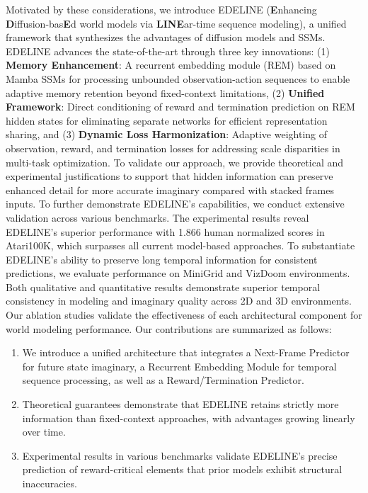 Motivated by these considerations, we introduce EDELINE (\textbf{E}nhancing \textbf{D}iffusion-bas\textbf{E}d world models via \textbf{LINE}ar-time sequence modeling), a unified framework that synthesizes the advantages of diffusion models and SSMs. EDELINE advances the state-of-the-art through three key innovations: (1) \textbf{Memory Enhancement}: A recurrent embedding module (REM) based on Mamba SSMs for processing unbounded observation-action sequences to enable adaptive memory retention beyond fixed-context limitations, (2) \textbf{Unified Framework}: Direct conditioning of reward and termination prediction on REM hidden states for eliminating separate networks for efficient representation sharing, and (3) \textbf{Dynamic Loss Harmonization}: Adaptive weighting of observation, reward, and termination losses for addressing scale disparities in multi-task optimization. To validate our approach, we provide theoretical and experimental justifications to support that hidden information can preserve enhanced detail for more accurate imaginary compared with stacked frames inputs. To further demonstrate EDELINE's capabilities, we conduct extensive validation across various benchmarks. The experimental results reveal EDELINE's superior performance with 1.866 human normalized scores in Atari100K, which surpasses all current model-based approaches. To substantiate EDELINE's ability to preserve long temporal information for consistent predictions, we evaluate performance on MiniGrid and VizDoom environments. Both qualitative and quantitative results demonstrate superior temporal consistency in modeling and imaginary quality across 2D and 3D environments. Our ablation studies validate the effectiveness of each architectural component for world modeling performance. Our contributions are summarized as follows:\vspace{-0.5em}
\begin{enumerate} [itemsep=3pt, parsep=0pt]
    \item We introduce a unified architecture that integrates a Next-Frame Predictor for future state imaginary, a Recurrent Embedding Module for temporal sequence processing, as well as a Reward/Termination Predictor.
    \item Theoretical guarantees demonstrate that EDELINE retains strictly more information than fixed-context approaches, with advantages growing linearly over time.
    \item Experimental results in various benchmarks validate EDELINE's precise prediction of reward-critical elements that prior models exhibit structural inaccuracies.
\end{enumerate}

